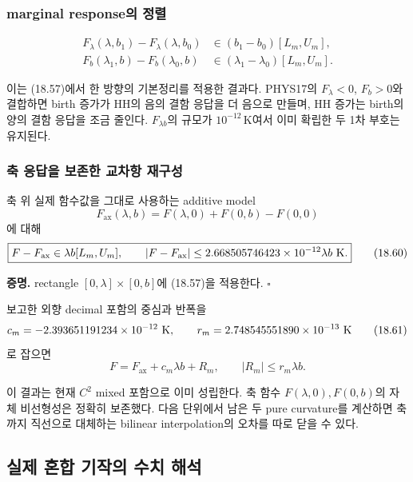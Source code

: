 \hypertarget{marginal-responseuxc758-uxc815uxb82c}{%
\subsubsection{marginal response의
정렬}\label{marginal-responseuxc758-uxc815uxb82c}}

\[
\begin{aligned}
F_\lambda(\lambda,b_1)-F_\lambda(\lambda,b_0)
&\in(b_1-b_0)[L_m,U_m],\\
F_b(\lambda_1,b)-F_b(\lambda_0,b)
&\in(\lambda_1-\lambda_0)[L_m,U_m].
\end{aligned}
\tag{18.59}
\]

이는 (18.57)에서 한 방향의 기본정리를 적용한 결과다. PHYS17의
\(F_\lambda<0\), \(F_b>0\)와 결합하면 birth 증가가 HH의 음의 결함 응답을
더 음으로 만들며, HH 증가는 birth의 양의 결함 응답을 조금 줄인다.
\(F_{\lambda b}\)의 규모가 \(10^{-12}\,\mathrm K\)여서 이미 확립한 두
1차 부호는 유지된다.

\hypertarget{uxcd95-uxc751uxb2f5uxc744-uxbcf4uxc874uxd55c-uxad50uxcc28uxd56d-uxc7acuxad6cuxc131}{%
\subsubsection{축 응답을 보존한 교차항
재구성}\label{uxcd95-uxc751uxb2f5uxc744-uxbcf4uxc874uxd55c-uxad50uxcc28uxd56d-uxc7acuxad6cuxc131}}

축 위 실제 함수값을 그대로 사용하는 additive model \[
F_{\mathrm{ax}}(\lambda,b)
=F(\lambda,0)+F(0,b)-F(0,0)
\] 에 대해 \[
\boxed{
F-F_{\mathrm{ax}}\in\lambda b[L_m,U_m],\qquad
|F-F_{\mathrm{ax}}|\le2.668505746423\times10^{-12}\lambda b\ {\rm K}.
}
\tag{18.60}
\]

\textbf{증명.} rectangle \([0,\lambda]\times[0,b]\)에 (18.57)을
적용한다. \(\square\)

보고한 외향 decimal 포함의 중심과 반폭을 \[
c_m=-2.393651191234\times10^{-12}\ {\rm K},\qquad
r_m=2.748545551890\times10^{-13}\ {\rm K}
\tag{18.61}
\] 로 잡으면 \[
\boxed{
F=F_{\mathrm{ax}}+c_m\lambda b+R_m,\qquad
|R_m|\le r_m\lambda b.
}
\tag{18.62}
\]

이 결과는 현재 \(C^2\) mixed 포함으로 이미 성립한다. 축 함수
\(F(\lambda,0),F(0,b)\)의 자체 비선형성은 정확히 보존했다. 다음 단위에서
남은 두 pure curvature를 계산하면 축까지 직선으로 대체하는 bilinear
interpolation의 오차를 따로 닫을 수 있다.

\hypertarget{uxc2e4uxc81c-uxd63cuxd569-uxae30uxc791uxc758-uxc218uxce58-uxd574uxc11d}{%
\subsection{실제 혼합 기작의 수치
해석}\label{uxc2e4uxc81c-uxd63cuxd569-uxae30uxc791uxc758-uxc218uxce58-uxd574uxc11d}}

